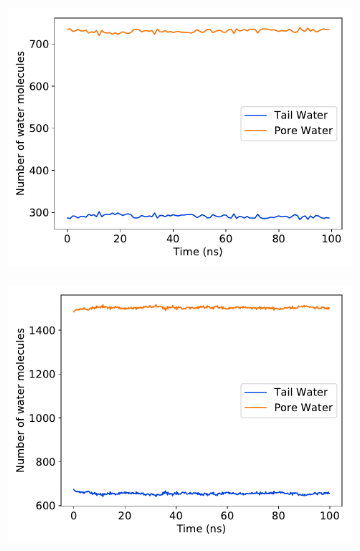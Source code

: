 \documentclass{article}
\begin{document}
  \begin{figure}
  \centering
  \begin{subfigure}{0.45\textwidth}
  \includegraphics[width=\textwidth]{5wt_offset_xlinked_equil.pdf}
  \caption{}\label{fig:5wt_offset_xlinked_equil}
  \end{subfigure}
  \begin{subfigure}{0.45\textwidth}
  \includegraphics[width=\textwidth]{10wt_offset_xlinked_equil.pdf}
  \caption{}\label{fig:10wt_offset_xlinked_equil}
  \end{subfigure}
  \caption{}\label{fig:solvation_equilibration}
  \end{figure}
\end{document}
